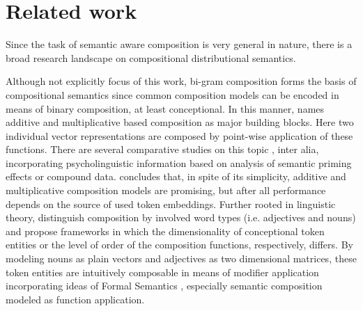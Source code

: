 \section{Related work}
Since the task of semantic aware composition is very general in nature, there is a broad research landscape on compositional distributional semantics. 

Although not explicitly focus of this work, bi-gram composition forms the basis of compositional semantics since common composition models can be encoded in means of binary composition, at least conceptional. In this manner, \textcite{zanzotto_estimating_2010} names additive and multiplicative based composition as major building blocks. Here two individual vector representations are composed by point-wise application of these functions. There are several comparative studies on this topic \autocite{mitchell_composition_2010, dima_reverse-engineering_2015}, inter alia, incorporating psycholinguistic information based on analysis of semantic priming effects or compound data. \textcite{mitchell_composition_2010} concludes that, in spite of its simplicity, additive and multiplicative composition models are promising, but after all performance depends on the source of used token embeddings. %
Further rooted in linguistic theory, \textcite{baroni_nouns_2010, clark_type-driven_2013, grefenstette_multi-step_2013, baroni_frege_2014} distinguish composition by involved word types (i.e. adjectives and nouns) and propose frameworks in which the dimensionality of conceptional token entities or the level of order of the composition functions, respectively, differs. By modeling nouns as plain vectors and adjectives as two dimensional matrices, these token entities are intuitively composable in means of modifier application incorporating ideas of Formal Semantics \autocite{montague_proper_1973}, especially semantic composition modeled as function application.%

